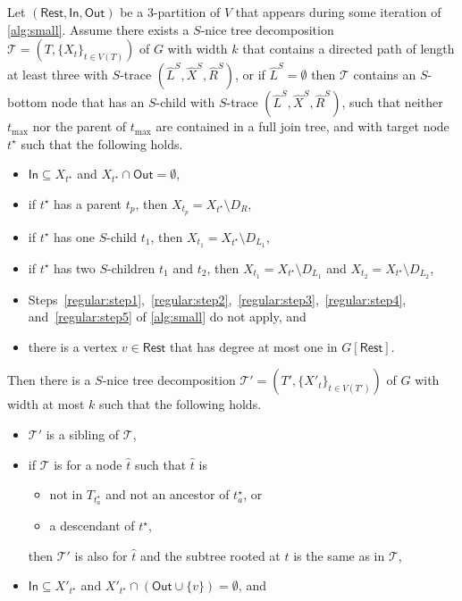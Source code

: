 \documentclass[a4paper,UKenglish,cleveref, autoref, thm-restate, numberwithinsect]{lipics-v2021}
\newcommand{\slim}{\text{slim}\xspace}
\newcommand{\topheavy}{\text{top-heavy}\xspace}
\newcommand{\In}{\mathsf{In}}
\newcommand{\Out}{\mathsf{Out}}
\newcommand{\Rest}{\mathsf{Rest}}
\begin{document}
\begin{lemma}\label{lem:regularstep6}
Let $(\Rest,\In,\Out)$ be a 3-partition of $V$ that appears during some iteration of \cref{alg:small}. 
Assume there exists a \slim $S$-nice tree decomposition $\mathcal{T}=(T,\{X_t\}_{t\in V(T)})$ of $G$ with width $k$ that contains a directed path of length at least three with $S$-trace $(\hat{L}^S, \hat{X}^S, \hat{R}^S)$, or if $\hat{L}^S=\emptyset$ then $\mathcal{T}$ contains an $S$-bottom node that has an $S$-child with $S$-trace $(\hat{L}^S, \hat{X}^S, \hat{R}^S)$, such that neither $t_{\max}$ nor the parent of $t_{\max}$ are contained in a full join tree, and with target node ${t^\star}$ such that the following holds.
\begin{itemize}
\item $\In\subseteq X_{t^\star}$ and $X_{t^\star}\cap \Out=\emptyset$, 
                \item if $t^\star$ has a parent $t_p$, then $X_{t_p}=X_{t^\star}\setminus D_R$, 
    \item if $t^\star$ has one $S$-child $t_1$, then $X_{t_1}=X_{t^\star}\setminus D_{L_1}$, 
    \item if $t^\star$ has two $S$-children $t_1$ and $t_2$, then $X_{t_1}=X_{t^\star}\setminus D_{L_1}$ and $X_{t_2}=X_{t^\star}\setminus D_{L_2}$, 
    \item Steps~\ref{regular:step1},~\ref{regular:step2},~\ref{regular:step3},~\ref{regular:step4}, and~\ref{regular:step5} of \cref{alg:small} do not apply, and
    \item there is a vertex $v\in\Rest$ that has degree at most one in $G[\Rest]$.
\end{itemize} 
Then there is a \slim $S$-nice tree decomposition $\mathcal{T}'=(T',\{X'_t\}_{t\in V(T')})$ of $G$ with width at most $k$ 
such that the following holds.
\begin{itemize}
\item $\mathcal{T}'$ is a sibling of $\mathcal{T}$,
\item if $\mathcal{T}$ is \topheavy for a node $\hat{t}$ such that $\hat{t}$ is
\begin{itemize}
    \item not in $T_{t^\star_a}$ and not an ancestor of $t^\star_a$, or
    \item a descendant of $t^\star$,
\end{itemize}
then $\mathcal{T}'$ is also \topheavy for $\hat{t}$ and the subtree rooted at $\hat{t}$ is the same as in $\mathcal{T}$,
\item $\In\subseteq X'_{t^{\star}}$ and $X'_{t^{\star}}\cap (\Out\cup\{v\})=\emptyset$, and

\end{itemize}
\end{lemma}
\end{document}

